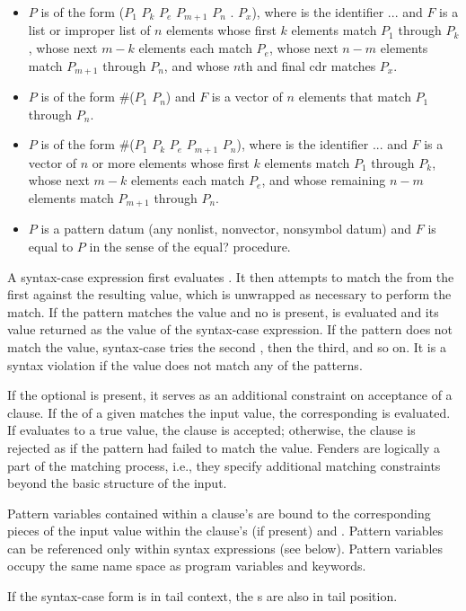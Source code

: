\begin{entry}
\begin{itemize}
\item $P$ is of the form
{\cf ($P_1$ \dotsfoo{} $P_k$ $P_e$  $P_{m+1}$ \dotsfoo{} $P_n$ . $P_x$)},
where  is the identifier {\cf ...}
and $F$ is a list or improper list of $n$
elements whose first $k$ elements match $P_1$ through $P_k$,
whose next $m-k$ elements each match $P_e$,
whose next $n-m$ elements match $P_{m+1}$ through $P_n$,
and 
whose $n$th and final cdr matches $P_x$.

\item $P$ is of the form
{\cf \#($P_1$ \dotsfoo{} $P_n$)}
and $F$ is a vector of $n$ elements that match $P_1$ through
$P_n$.

\item $P$ is of the form
{\cf \#($P_1$ \dotsfoo{} $P_k$ $P_e$  $P_{m+1}$ \dotsfoo{} $P_n$)},
where  is the identifier {\cf ...}
and $F$ is a vector of $n$ or more elements
whose first $k$ elements match $P_1$ through $P_k$,
whose next $m-k$ elements each match $P_e$,
and
whose remaining $n-m$ elements match $P_{m+1}$ through $P_n$.

\item $P$ is a pattern datum (any nonlist, nonvector, nonsymbol
datum) and $F$ is equal to $P$ in the sense of the
{\cf equal?} procedure.
\end{itemize}

\semantics
A {\cf syntax-case} expression first evaluates .
It then attempts to match
the  from the first  against the resulting value,
which is unwrapped as necessary to perform the match.
If the pattern matches the value and no
 is present,
 is evaluated and its value returned as the
value of the {\cf syntax-case} expression.
If the pattern does not match the value, {\cf syntax-case} tries
the second , then the third, and so on.
It is a syntax violation if the value does not match any of the patterns.

If the optional  is present, it serves as an additional
constraint on acceptance of a clause.
If the  of a given  matches the input value,
the corresponding  is evaluated.
If  evaluates to a true value, the clause is accepted;
otherwise, the clause is rejected as if the pattern had failed to match
the value.
Fenders are logically a part of the matching process, i.e., they
specify additional matching constraints beyond the basic structure of
the input.

Pattern variables contained within a clause's
 are bound to the corresponding pieces of the input
value within the clause's  (if present) and
.
Pattern variables can be referenced only within {\cf syntax}
expressions (see below).
Pattern variables occupy the same name space as program variables and
keywords.

If the {\cf syntax-case} form is in tail context, the s are also in tail position.
\end{entry}

